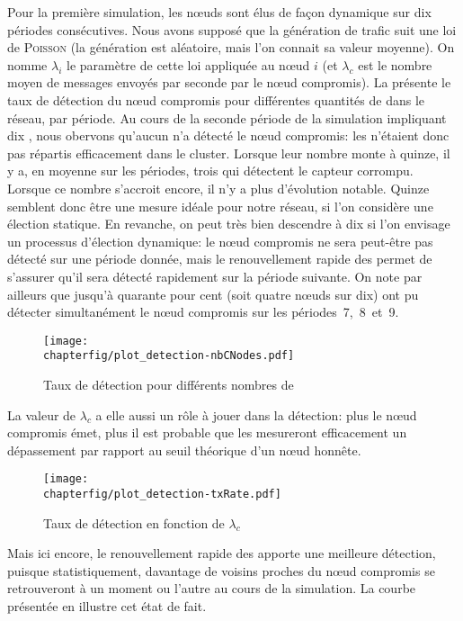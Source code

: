 Pour la première simulation, les nœuds sont élus de façon dynamique sur dix périodes consécutives.
Nous avons supposé que la génération de trafic suit une loi de \textsc{Poisson} (la génération est aléatoire, mais l'on connait sa valeur moyenne).
On nomme $\lambda_i$ le paramètre de cette loi appliquée au nœud $i$ (et $\lambda_c$ est le nombre moyen de messages envoyés par seconde par le nœud compromis).
La  présente le taux de détection du nœud compromis pour différentes quantités de \cns dans le réseau, par période.
Au cours de la seconde période de la simulation impliquant dix \cns, nous obervons qu'aucun \cn n'a détecté le nœud compromis: les \cns n'étaient donc pas répartis efficacement dans le cluster.
Lorsque leur nombre monte à quinze, il y a, en moyenne sur les périodes, trois \cns qui détectent le capteur corrompu.
Lorsque ce nombre s'accroit encore, il n'y a plus d'évolution notable.
Quinze \cns semblent donc être une mesure idéale pour notre réseau, si l'on considère une élection statique.
En revanche, on peut très bien descendre à dix \cns si l'on envisage un processus d'élection dynamique: le nœud compromis ne sera peut-être pas détecté sur une période donnée, mais le renouvellement rapide des \cns permet de s'assurer qu'il sera détecté rapidement sur la période suivante.
On note par ailleurs que jusqu'à quarante pour cent (soit quatre nœuds sur dix) ont pu détecter simultanément le nœud compromis sur les périodes~7,~8~et~9.
\begin{figure}[t]
    \centering
    \texttt{[image: \\chapterfig/plot\_detection-nbCNodes.pdf]}
    \caption{Taux de détection pour différents nombres de \cns}\label{sa:fig:detec-nbcn}
\end{figure}

La valeur de $\lambda_c$ a elle aussi un rôle à jouer dans la détection: plus le nœud compromis émet, plus il est probable que les \cns mesureront efficacement un dépassement par rapport au seuil théorique d'un nœud honnête.
\begin{figure}[!b]
    \centering
    \texttt{[image: \\chapterfig/plot\_detection-txRate.pdf]}
    \caption{Taux de détection en fonction de $\lambda_c$}\label{sa:fig:detection-txRate}
\end{figure}
Mais ici encore, le renouvellement rapide des \cns apporte une meilleure détection, puisque statistiquement, davantage de voisins proches du nœud compromis se retrouveront \cns à un moment ou l'autre au cours de la simulation.
La courbe présentée en  illustre cet état de fait.

